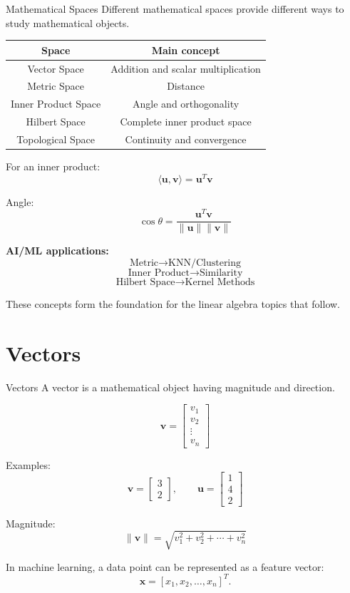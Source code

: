 \documentclass[aspectratio=169]{beamer}
\begin{document}
\begin{frame}{Mathematical Spaces}
Different mathematical spaces provide different ways to study mathematical objects.

\begin{center}
\begin{tabular}{|c|c|}
\hline
\textbf{Space} & \textbf{Main concept}\\
\hline
Vector Space & Addition and scalar multiplication\\
Metric Space & Distance\\
Inner Product Space & Angle and orthogonality\\
Hilbert Space & Complete inner product space\\
Topological Space & Continuity and convergence\\
\hline
\end{tabular}
\end{center}

For an inner product:
\[
\langle\mathbf u,\mathbf v\rangle=\mathbf u^T\mathbf v
\]

Angle:
\[
\cos\theta=
\frac{\mathbf u^T\mathbf v}
{\|\mathbf u\|\|\mathbf v\|}
\]

\textbf{AI/ML applications:}
\[
\text{Metric}\rightarrow\text{KNN/Clustering}
\]
\[
\text{Inner Product}\rightarrow\text{Similarity}
\]
\[
\text{Hilbert Space}\rightarrow\text{Kernel Methods}
\]

These concepts form the foundation for the linear algebra topics that follow.
\end{frame}

\section{Vectors}

\begin{frame}{Vectors}
A vector is a mathematical object having magnitude and direction.

\[
\mathbf v=
\begin{bmatrix}
v_1\\v_2\\\vdots\\v_n
\end{bmatrix}
\]

Examples:
\[
\mathbf v=\begin{bmatrix}3\\2\end{bmatrix},
\qquad
\mathbf u=\begin{bmatrix}1\\4\\2\end{bmatrix}
\]

Magnitude:
\[
\|\mathbf v\|=\sqrt{v_1^2+v_2^2+\cdots+v_n^2}
\]

In machine learning, a data point can be represented as a feature vector:
\[
\mathbf x=[x_1,x_2,\ldots,x_n]^T.
\]
\end{frame}
\end{document}
